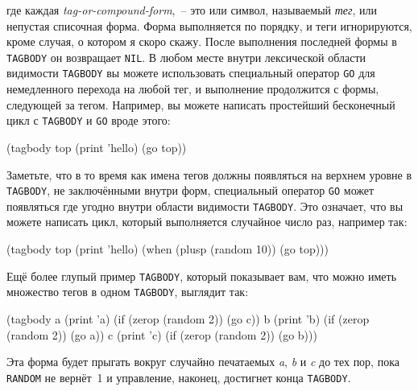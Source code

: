 \noindent{}где каждая \textit{tag-or-compound-form},~-- это или символ, называемый \textit{тег}, или
непустая списочная форма. Форма выполняется по порядку, и теги игнорируются, кроме случая,
о котором я скоро скажу. После выполнения последней формы в \lstinline{TAGBODY} он
возвращает \lstinline{NIL}. В любом месте внутри лексической области видимости \lstinline{TAGBODY}
вы можете использовать специальный оператор \lstinline{GO} для немедленного перехода на любой
тег, и выполнение продолжится с формы, следующей за тегом. Например, вы можете написать
простейший бесконечный цикл с \lstinline{TAGBODY} и \lstinline{GO} вроде этого:

\begin{myverb}
(tagbody
 top
   (print 'hello)
   (go top))
\end{myverb}

Заметьте, что в то время как имена тегов должны появляться на верхнем уровне в
\lstinline{TAGBODY}, не заключёнными внутри форм, специальный оператор \lstinline{GO} может
появляться где угодно внутри области видимости \lstinline{TAGBODY}. Это означает, что вы можете
написать цикл, который выполняется случайное число раз, например так:

\begin{myverb}
(tagbody
 top
   (print 'hello)
   (when (plusp (random 10)) (go top)))
\end{myverb}

Ещё более глупый пример \lstinline{TAGBODY}, который показывает вам, что можно иметь множество
тегов в одном \lstinline{TAGBODY}, выглядит так:

\begin{myverb}
(tagbody
 a (print 'a) (if (zerop (random 2)) (go c))
 b (print 'b) (if (zerop (random 2)) (go a))
 c (print 'c) (if (zerop (random 2)) (go b)))
\end{myverb}

Эта форма будет прыгать вокруг случайно печатаемых \textit{a}, \textit{b} и \textit{c} до
тех пор, пока \lstinline{RANDOM} не вернёт~1 и управление, наконец, достигнет конца
\lstinline{TAGBODY}.

